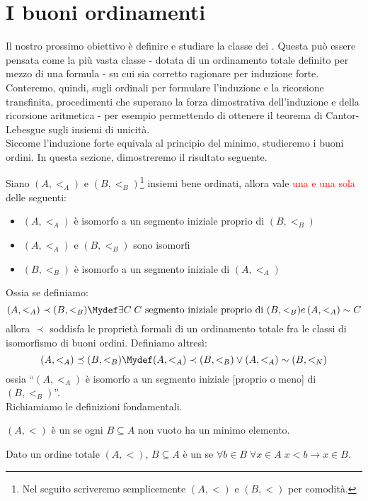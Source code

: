 \documentclass[11pt]{scrartcl}
\begin{document}
\newpage
\section{I buoni ordinamenti}
Il nostro prossimo obiettivo è definire e studiare la classe dei . Questa può essere pensata come la più vasta classe
- dotata di un ordinamento totale definito per mezzo di una formula - su cui sia corretto ragionare per induzione forte. Conteremo, quindi, sugli ordinali per formulare 
l'induzione e la ricorsione transfinita, procedimenti che superano la forza dimostrativa dell'induzione e della ricorsione aritmetica - per esempio permettendo di ottenere 
il teorema di Cantor-Lebesgue sugli insiemi di unicità.\\
Siccome l'induzione forte equivala al principio del minimo, studieremo i buoni ordini. In questa sezione, dimostreremo il risultato seguente.

\begin{theorem}
	Siano $(A,<_A)$ e $(B,<_B)$\footnote{Nel seguito scriveremo semplicemente $(A,<)$ e $(B,<)$ per comodità.} insiemi bene ordinati, allora vale \textcolor{red}{una e una sola} delle seguenti:
	\begin{itemize}
		\item $(A,<_A)$ è isomorfo a un segmento iniziale proprio di $(B,<_B)$
		\item $(A,<_A)$ e $(B,<_B)$ sono isomorfi
		\item $(B,<_B)$ è isomorfo a un segmento iniziale di $(A,<_A)$
	\end{itemize}
\end{theorem}

Ossia se definiamo:
\[ (A,<_A) \prec (B,<_B) \Mydef \exists C \; \text{$C$ segmento iniziale proprio di $(B,<_B) e$} \, (A,<_A) \sim C
	\]
allora $\prec$ soddisfa le proprietà formali di un ordinamento totale fra le classi di isomorfismo di buoni ordini.
Definiamo altresì:
\[ (A,<_A) \preceq (B,<_B) \Mydef (A,<_A) \prec (B,<_B) \lor (A,<_A) \sim (B,<_N)
	\]
ossia ``$(A,<_A)$ è isomorfo a un segmento iniziale [proprio o meno] di $(B,<_B)$''.\\
Richiamiamo le definizioni fondamentali.

\begin{definition}
	$(A,<)$ è un  se ogni $B \subseteq A$ non vuoto ha un minimo elemento.
\end{definition}

\begin{definition}
	Dato un ordine totale $(A,<)$, $B \subseteq A$ è un  se $\forall b \in B \; \forall x \in A \; x < b \rightarrow x \in B$.
\end{definition}
\end{document}
